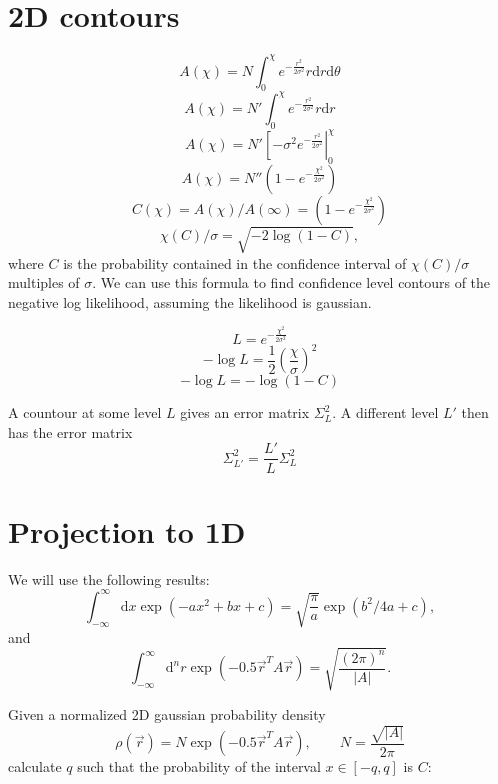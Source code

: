 \documentclass[12pt]{article}
\newcommand{\dee}{\mathrm{d}}
\newcommand{\abs}[1]{\left|#1\right|}
\begin{document}
\section{2D contours}

\[A(\chi) = N\int_0^\chi e^{-\frac{r^2}{2\sigma^2}} r\dee r\dee\theta\]
\[A(\chi) = N'\int_0^\chi e^{-\frac{r^2}{2\sigma^2}} r\dee r\]
\[A(\chi) = N'\left[-\sigma^2e^{-\frac{r^2}{2\sigma^2}}\right|_0^\chi\]
\[A(\chi) = N''\left(1-e^{-\frac{\chi^2}{2\sigma^2}}\right)\]
\[C(\chi) = A(\chi)/A(\infty) = \left(1-e^{-\frac{\chi^2}{2\sigma^2}}\right)\]
\[\chi(C)/\sigma = \sqrt{-2\log(1-C)},\]
where $C$ is the probability contained in the confidence interval of
$\chi(C)/\sigma$ multiples of $\sigma$.  We can use this formula to
find confidence level contours of the negative log likelihood,
assuming the likelihood is gaussian.

\[L = e^{-\frac{\chi^2}{2\sigma^2}}\]
\[-\log L = \frac{1}{2}\left(\frac{\chi}{\sigma}\right)^2\]
\[-\log L = -\log( 1-C )\]

A countour at some level $L$ gives an error matrix $\Sigma^2_L$.  A
different level $L'$ then has the error matrix
\[\Sigma^2_{L'} = \frac{L'}{L}\Sigma^2_L\]


\section{Projection to 1D}

We will use the following results:
\begin{equation}
  \int_{-\infty}^{\infty}\dee x \exp\left(-ax^2+bx+c\right) = \sqrt{\frac{\pi}{a}}\exp\left(b^2/4a + c\right),
\end{equation}
and
\begin{equation}
  \int_{-\infty}^\infty \dee^nr\exp\left(-0.5 \vec{r}^TA\vec{r}\right) = \sqrt{\frac{(2\pi)^n}{\abs{A}}}.
\end{equation}

Given a normalized 2D gaussian probability density
\[
\rho(\vec{r}) = N \exp(-0.5 \vec{r}^TA\vec{r}), \qquad N = \frac{\sqrt{\abs{A}}}{2\pi}
\]
calculate $q$ such that the probability of the interval $x\in[-q,q]$
is $C$:
\end{document}
